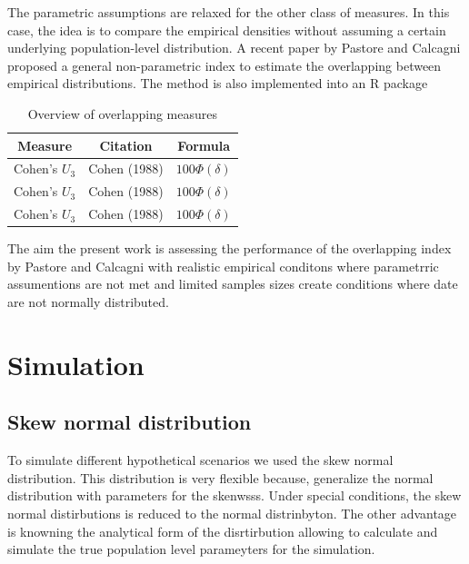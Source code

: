 \documentclass[man]{apa7}
\begin{document}

The parametric assumptions are relaxed for the other class of measures. In this case, the idea is to compare the empirical densities without assuming a certain underlying population-level distribution. A recent paper by Pastore and Calcagni \citep{Pastore2019-tq} proposed a general non-parametric index to estimate the overlapping between empirical distributions. The method is also implemented into an R package %


\begin{table}[]
\caption{Overview of overlapping measures}
\begin{tabular}{|c|c|c|}
\hline
Measure       & Citation     & Formula            \\
\hline
Cohen's $U_3$ & Cohen (1988) & $100 \Phi(\delta)$ \\
\hline
Cohen's $U_3$ & Cohen (1988) & $100 \Phi(\delta)$ \\
\hline
Cohen's $U_3$ & Cohen (1988) & $100 \Phi(\delta)$ \\
\hline
\end{tabular}
\end{table}


The aim the present work is assessing the performance of the overlapping index by Pastore and Calcagni with realistic empirical conditons where parametrric assumentions are not met and limited samples sizes create conditions where date are not normally distributed. %

\section{Simulation}

\subsection{Skew normal distribution}

To simulate different hypothetical scenarios we used the skew normal distribution. This distribution is very flexible because, generalize the normal distribution with parameters for the skenwsss. Under special conditions, the skew normal distirbutions is reduced to the normal distrinbyton. The other advantage is knowning the analytical form of the disrtirbution allowing to calculate and simulate the true population level parameyters for the simulation.
\end{document}

